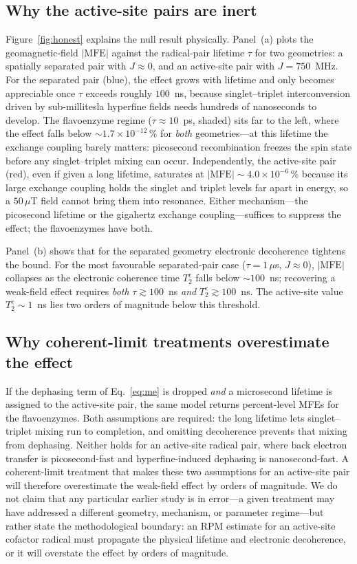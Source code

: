 \documentclass[twoside,twocolumn,9pt]{article}
\begin{document}
\subsection{Why the active-site pairs are inert}

Figure~\ref{fig:honest} explains the null result physically. Panel~(a) plots the
geomagnetic-field $|\mathrm{MFE}|$ against the radical-pair lifetime $\tau$ for
two geometries: a spatially separated pair with $J\approx0$, and an active-site
pair with $J = 750$~MHz. For the separated pair (blue), the effect grows with
lifetime and only becomes appreciable once $\tau$ exceeds roughly $100$~ns,
because singlet--triplet interconversion driven by sub-millitesla hyperfine
fields needs hundreds of nanoseconds to develop. The flavoenzyme regime
($\tau\approx10$~ps, shaded) sits far to the left, where the effect falls below
$\sim\!1.7\times10^{-12}\,\%$ for \emph{both} geometries---at this lifetime the
exchange coupling barely matters: picosecond recombination freezes the spin state before any
singlet--triplet mixing can occur. Independently, the active-site pair (red),
even if given a long lifetime, saturates at $|\mathrm{MFE}|\sim 4.0\times10^{-6}\,\%$
because its large exchange coupling holds the singlet and triplet levels far
apart in energy, so a $50\,\mu$T field cannot bring them into resonance. Either
mechanism---the picosecond lifetime or the gigahertz exchange coupling---suffices
to suppress the effect; the flavoenzymes have both.

Panel~(b) shows that for the separated geometry electronic decoherence tightens the bound. For the most
favourable separated-pair case ($\tau = 1\,\mu$s, $J\approx0$), $|\mathrm{MFE}|$
collapses as the electronic coherence time $T_2^e$ falls below $\sim100$~ns;
recovering a weak-field effect requires \emph{both} $\tau\gtrsim100$~ns
\emph{and} $T_2^e\gtrsim100$~ns. The active-site value $T_2^e\sim1$~ns lies two
orders of magnitude below this threshold.

\subsection{Why coherent-limit treatments overestimate the effect}

If the dephasing term of Eq.~\eqref{eq:me} is dropped \emph{and} a microsecond
lifetime is assigned to the active-site pair, the same model returns percent-level
MFEs for the flavoenzymes. Both assumptions are required: the long lifetime lets
singlet--triplet mixing run to completion, and omitting decoherence prevents that
mixing from dephasing. Neither holds for an active-site radical pair, where back
electron transfer is picosecond-fast and hyperfine-induced dephasing is
nanosecond-fast. A coherent-limit treatment that makes these two assumptions for
an active-site pair will therefore overestimate the weak-field effect by orders
of magnitude. We do not claim that any particular earlier study is in error---a
given treatment may have addressed a different geometry, mechanism, or parameter
regime---but rather state the methodological boundary: an RPM estimate for an
active-site cofactor radical must propagate the physical lifetime and electronic
decoherence, or it will overstate the effect by orders of magnitude.
\end{document}
